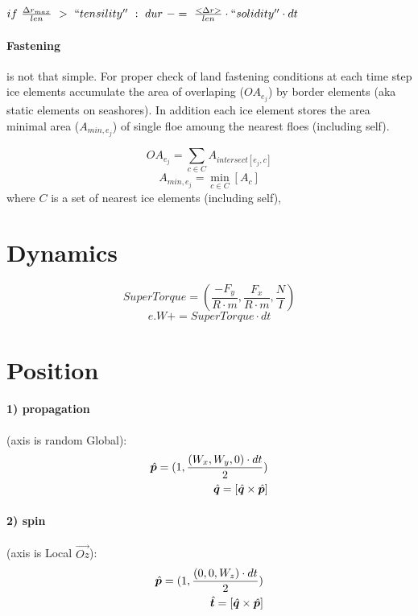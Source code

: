  $if\ \frac{\Delta r_{max}}{len}\ >\ ``tensility''\ :\ dur\ -=
 \ \frac{<\Delta r>}{len} \cdot ``solidity'' \cdot dt$
 
\paragraph{Fastening} is not that simple.
For proper check of land fastening conditions at each time step
ice elements accumulate the area of overlaping ($OA_{e_j}$) by
border elements (aka static elements on seashores). In addition 
each ice element stores the area minimal area ($A_{min,e_j}$)
of single floe amoung the nearest floes (including self).
 
\begin{equation}
 OA_{e_j} = \sum_{c \in C} A_{intersect[e_j,c]} 
\end{equation}
\begin{equation}
 A_{min,e_j} = \min_{c \in C} [A_c]
\end{equation}
where $C$ is a set of nearest ice elements (including self), 
 
\section{Dynamics}
 
\begin{equation}
 SuperTorque = ( \frac{-F_y}{R \cdot m}, \frac{F_x}{R \cdot m}, \frac{N}{I})
\end{equation}
\begin{equation}
 e.W += SuperTorque \cdot dt
\end{equation}

\section{Position}

\paragraph{1) propagation} (axis is random Global):
\begin{eqnarray}
  {\hat{\bm{p}}} = (1, \frac{(W_x, W_y, 0) \cdot dt}{2}) \\
  {\hat{\bm{q}}} = [{\hat{\bm{q}}} \times {\hat{\bm{p}}}]
\end{eqnarray}

\paragraph{2) spin} (axis is Local $\vec{Oz}$):
\begin{eqnarray}
  {\hat{\bm{p}}} = (1, \frac{(0, 0, W_z) \cdot dt}{2}) \\
  {\hat{\bm{t}}} = [{\hat{\bm{q}}} \times {\hat{\bm{p}}}]
\end{eqnarray}

